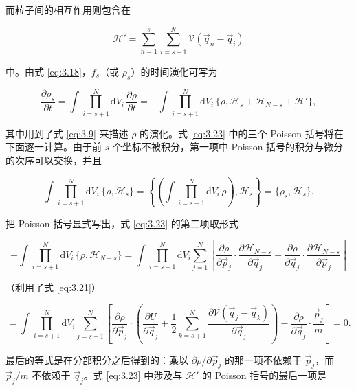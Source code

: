 而粒子间的相互作用则包含在

\begin{equation}\label{eq:3.22}
  \mathscr H'=\sum_{n=1}^s\sum_{i=s+1}^N\mathscr V(\vec q_n-\vec q_i)
\end{equation}

中。由式 \eqref{eq:3.18}，$f_s$（或 $\rho_s$）的时间演化可写为

\begin{equation}\label{eq:3.23}
  \frac{\partial\rho_s}{\partial t}=\int\prod_{i=s+1}^N \mathrm{d}V_i\,\frac{\partial\rho}{\partial t}=-\int\prod_{i=s+1}^N \mathrm{d}V_i\,\{\rho,\mathscr H_s+\mathscr H_{N-s}+\mathscr H'\},
\end{equation}

其中用到了式 \eqref{eq:3.9} 来描述 $\rho$ 的演化。式 \eqref{eq:3.23} 中的三个 Poisson 括号将在下面逐一计算。由于前 $s$ 个坐标不被积分，第一项中 Poisson 括号的积分与微分的次序可以交换，并且

\begin{equation}\label{eq:3.24}
  \int\prod_{i=s+1}^N \mathrm{d}V_i\,\{\rho,\mathscr H_s\}=\left\{\left(\int\prod_{i=s+1}^N \mathrm{d}V_i\,\rho\right),\mathscr H_s\right\}=\{\rho_s,\mathscr H_s\}.
\end{equation}

把 Poisson 括号显式写出，式 \eqref{eq:3.23} 的第二项取形式

\begin{equation*}
  -\int\prod_{i=s+1}^N \mathrm{d}V_i\,\{\rho,\mathscr H_{N-s}\}=\int\prod_{i=s+1}^N \mathrm{d}V_i\sum_{j=1}^N\left[\frac{\partial\rho}{\partial\vec p_j}\cdot\frac{\partial\mathscr H_{N-s}}{\partial\vec q_j}-\frac{\partial\rho}{\partial\vec q_j}\cdot\frac{\partial\mathscr H_{N-s}}{\partial\vec p_j}\right]
\end{equation*}

（利用了式 \eqref{eq:3.21}）

\begin{equation}\label{eq:3.25}
  =\int\prod_{i=s+1}^N \mathrm{d}V_i\sum_{j=s+1}^N\left[\frac{\partial\rho}{\partial\vec p_j}\cdot\left(\frac{\partial U}{\partial\vec q_j}+\frac12\sum_{k=s+1}^N\frac{\partial\mathscr V(\vec q_j-\vec q_k)}{\partial\vec q_j}\right)-\frac{\partial\rho}{\partial\vec q_j}\cdot\frac{\vec p_j}{m}\right]=0.
\end{equation}

最后的等式是在分部积分之后得到的：乘以 $\partial\rho/\partial\vec p_j$ 的那一项不依赖于 $\vec p_j$，而 $\vec p_j/m$ 不依赖于 $\vec q_j$。式 \eqref{eq:3.23} 中涉及与 $\mathscr H'$ 的 Poisson 括号的最后一项是

